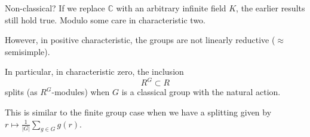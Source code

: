 \documentclass{beamer}
\newcommand{\md}[1]{{\left\lvert #1 \right\lvert}}
\begin{document}
	\begin{frame}{Non-classical?}
		If we replace $\mathbb{C}$ with an arbitrary infinite field $K$, the earlier results still hold true. \pause \hfill {\tiny Modulo some care in characteristic two.}

		\pause However, in positive characteristic, the groups are not linearly reductive \pause ($\approx$ semisimple). 

		\pause In particular, in characteristic zero, the inclusion
		\begin{equation*} 
			R^{G} \subset R
		\end{equation*}
		splits (as $R^{G}$-modules) when $G$ is a classical group with the natural action. 

		\pause This is similar to the finite group case when we have a splitting given by $r \mapsto \frac{1}{\md{G}} \sum\limits_{g \in G} g(r)$.
	\end{frame}

\end{document}
